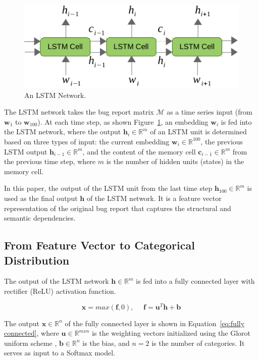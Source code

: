 \begin{figure}[t]
\centering
\includegraphics[scale=0.9]{figures/lstm2.pdf}
\caption{An LSTM Network.}
\label{fig:lstm2}
\end{figure}

The LSTM network takes the bug report matrix $\mathcal{M}$ as a time series input (from $\mathbf{w}_1$ to $\mathbf{w}_{100}$). At each time step, as shown Figure~\ref{fig:lstm2}, an embedding $\mathbf{w}_i$ is fed into the LSTM network, where the output $\mathbf{h}_i \in \mathbb{R}^{m}$ of an LSTM unit is determined based on three types of input: the current embedding $\mathbf{w}_i \in \mathbb{R}^{100}$, the previous LSTM output $\mathbf{h}_{i-1} \in \mathbb{R}^{m}$, and the content of the memory cell $\mathbf{c}_{i-1} \in \mathbb{R}^{m}$ from the previous time step, where $m$ is the number of hidden units (states) in the memory cell.

In this paper, the output of the LSTM unit from the last time step $\mathbf{h}_{100} \in \mathbb{R}^{m}$ is used as the final output $\mathbf{h}$ of the LSTM network. It is a feature vector representation of the original bug report that captures the structural and semantic dependencies.

\subsection{From Feature Vector to Categorical Distribution}
\label{sec:categorical distribution}
The output of the LSTM network $\mathbf{h} \in \mathbb{R}^{m}$ is fed into a fully connected layer with rectifier (ReLU) \cite{Nair:2010:RLU:3104322.3104425} activation function.

\begin{equation}
  \mathbf{x} = max(\mathbf{f}, 0), \:\:\:\:\:\: \mathbf{f} = \mathbf{u}^T \mathbf{h} + \mathbf{b}
\label{eq:fully connected}
\end{equation}

The output $\mathbf{x} \in \mathbb{R}^{n}$ of the fully connected layer is shown in Equation~\ref{eq:fully connected}, where $\mathbf{u} \in \mathbb{R}^{mxn}$ is the weighting vectors initialized using the Glorot uniform scheme \cite{DBLP:journals/jmlr/GlorotB10}, $\mathbf{b} \in \mathbb{R}^{n}$ is the bias, and $n=2$ is the number of categories. It serves as input to a Softmax model.

